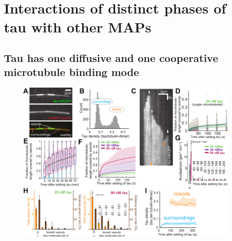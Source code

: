 \section{Interactions of distinct phases of tau with other MAPs}
\label{sec:tau}
\subsection{Tau has one diffusive and one cooperative microtubule binding mode}
\begin{figure}[b!]
\centering
\includegraphics[width=1\linewidth]{Figures/tauGROW.png}
\end{figure}
